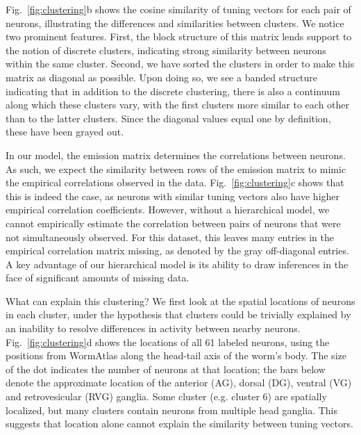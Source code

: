 \documentclass[11pt]{article}
\begin{document}
Fig.~\ref{fig:clustering}b shows the cosine similarity of tuning
vectors for each pair of neurons, illustrating the differences
and similarities between clusters.  We notice two prominent
features.  First, the block structure of this
matrix lends support to the notion of discrete clusters, indicating
strong similarity between neurons within the same cluster. Second,
we have sorted the clusters in order to make this matrix as
diagonal as possible.  Upon doing so, we see a banded structure
indicating that in addition to the discrete clustering, there is
also a continuum along which these clusters vary, with the first
clusters more similar to each other than to the latter clusters.
Since the diagonal values equal one by definition, these
have been grayed out. 

In our model, the emission matrix determines the correlations between
neurons.  As such, we expect the similarity between rows of the
emission matrix to mimic the empirical correlations observed in the
data.  Fig.~\ref{fig:clustering}c shows that this is indeed the case,
as neurons with similar tuning vectors also have higher empirical
correlation coefficients.  However, without a hierarchical model, we
cannot empirically estimate the correlation between pairs of neurons
that were not simultaneously observed.  For this dataset, this leaves
many entries in the empirical correlation matrix missing, as denoted
by the gray off-diagonal entries. A key advantage of our hierarchical
model is its ability to draw inferences in the face of significant
amounts of missing data.

What can explain this clustering?  We first look at the spatial
locations of neurons in each cluster, under the hypothesis that
clusters could be trivially explained by an inability to resolve
differences in activity between nearby neurons.
Fig.~\ref{fig:clustering}d shows the locations of all 61 labeled
neurons, using the positions from WormAtlas along the
head-tail axis of the worm's body.  The size of the dot indicates the
number of neurons at that location; the bars below denote the
approximate location of the anterior (AG), dorsal (DG), ventral (VG)
and retrovesicular (RVG) ganglia.  Some cluster (e.g. cluster 6) are
spatially localized, but many clusters contain neurons from multiple
head ganglia.  This suggests that location alone cannot explain the
similarity between tuning vectors.


\end{document}
